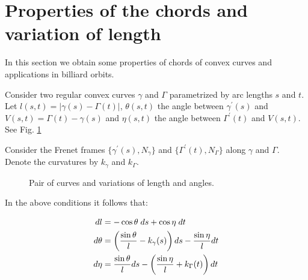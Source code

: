   
\section{Properties of the chords and variation of length}

In this section we obtain some  properties of chords of convex curves and applications in billiard orbits.
 
Consider two regular convex curves $\gamma$ and $\Gamma$ parametrized by arc lengths $s$ and $t$. 
Let $l(s,t)=|\gamma(s)-\Gamma(t)|$, $\theta(s,t) $ the angle between $\gamma^\prime(s)$ and $V(s,t)=\Gamma(t)-\gamma(s)$ and  $\eta(s,t) $ the angle between $\Gamma^\prime(t)$ and $V(s,t)$. See Fig. \ref{fig:1corda}

Consider the Frenet frames $\{\gamma^\prime (s), N_\gamma\}$ and $\{\Gamma^\prime (t), N_\Gamma\}$ along $\gamma$ and $\Gamma$.  Denote the curvatures by $k_\gamma$ and 
$k_\Gamma$.

\begin{figure}[H]
	\begin{center}
		\def\svgwidth{0.75\textwidth}
	 	
		\caption {Pair of curves and variations of length and angles.\label{fig:1corda}}
	\end{center}
\end{figure}

\begin{proposition}  In the above conditions it follows that:


	\begin{equation}
\aligned
dl&= -\cos\theta\;   ds + \cos\eta\;   dt\\
d\theta &=\left( \frac{\sin\theta }{l }-k_{ \gamma}(s)\right) ds -\frac{\sin\eta}{l } dt\\
d\eta &=  \frac{\sin\theta }{l } ds  - \left(  \frac{\sin\eta}{l } + k_{\Gamma }(t)\right)  dt
\endaligned
\label{eq:variacaoL}
\end{equation}
\label{prop:variacaoL}
\end{proposition}

